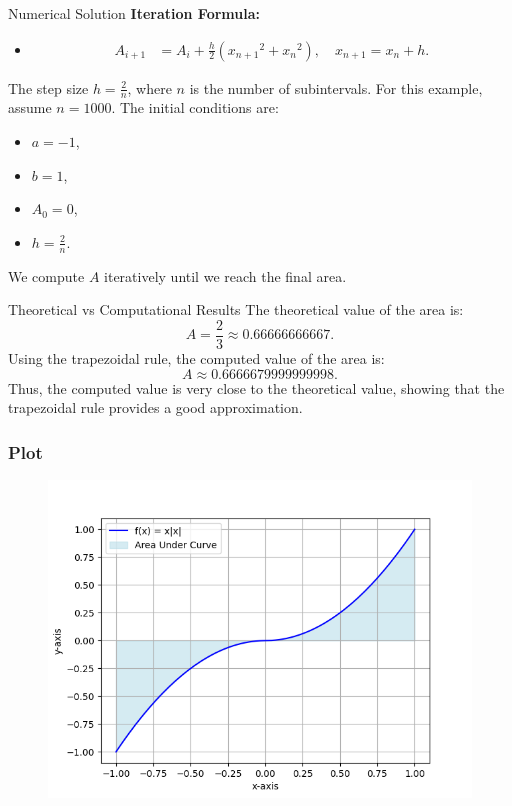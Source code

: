 \documentclass{beamer}
\begin{document}
\begin{frame}{Numerical Solution}
\textbf{Iteration Formula:}
  \begin{itemize}
    \item \begin{align*}
      A_{i+1} &= A_i + \frac{h}{2} \left( {x_{n+1}}^2 + {x_n}^2 \right), \quad x_{n+1} = x_n + h.
    \end{align*}
  \end{itemize}
  The step size \( h = \frac{2}{n} \), where \( n \) is the number of subintervals. For this example, assume \( n = 1000 \). The initial conditions are:
\begin{itemize}
    \item \( a = -1 \),
    \item \( b = 1 \),
    \item \( A_0 = 0 \),
    \item \( h = \frac{2}{n} \).
\end{itemize}
We compute \( A \) iteratively until we reach the final area.
\end{frame}

\begin{frame}{Theoretical vs Computational Results}
The theoretical value of the area is:
\[
A = \frac{2}{3} \approx 0.66666666667.
\]
Using the trapezoidal rule, the computed value of the area is:
\[
A \approx 0.6666679999999998.
\]
Thus, the computed value is very close to the theoretical value, showing that the trapezoidal rule provides a good approximation.
\end{frame}

\begin{frame}
\frametitle{Plot}
\begin{figure}[h]
	\centering
	\includegraphics[scale=0.5]{figs/fig.png}
\end{figure}
\end{frame}
\end{document}
